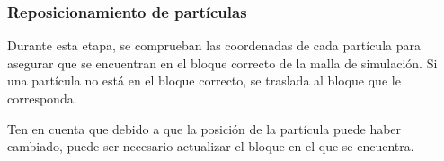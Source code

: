 \subsubsection{Reposicionamiento de partículas}

Durante esta etapa, se comprueban las coordenadas de cada partícula para
asegurar que se encuentran en el bloque correcto de la malla de simulación.
Si una partícula no está en el bloque correcto, se traslada al bloque que le
corresponda.

Ten en cuenta que debido a que la posición de la partícula puede haber
cambiado, puede ser necesario actualizar el bloque en el que se encuentra. 
